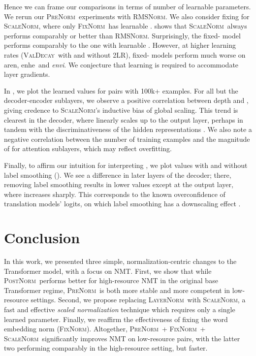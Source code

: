 \documentclass[11pt,a4paper]{article}
\newcommand{\keyword}[1]{\textit{#1}}
\newcommand{\arTOen}{ar\textrightarrow en}
\newcommand{\enTOhe}{en\textrightarrow he}
\newcommand{\enTOvi}{\textit{en\textrightarrow vi}}
\newcommand{\LNorm}{\textsc{LayerNorm}}
\newcommand{\SCNorm}{\textsc{ScaleNorm}}
\newcommand{\RMSNorm}{\textsc{RMSNorm}}
\newcommand{\PreNorm}{\textsc{PreNorm}}
\newcommand{\PostNorm}{\textsc{PostNorm}}
\newcommand{\fixnorm}{\textsc{FixNorm}}
\newcommand{\VALBASED}{\textsc{ValDecay}}
\newcommand{\lrtwo}{\textsc{2LR}}
\begin{document}
Hence we can frame our comparisons in terms of number of learnable parameters. We rerun our \PreNorm\ experiments with \RMSNorm. We also consider fixing  for \SCNorm, where only \fixnorm\ has learnable .  shows that \SCNorm\ always performs comparably or better than \RMSNorm. Surprisingly, the fixed- model performs comparably to the one with learnable . However, at higher learning rates (\VALBASED\ with and without \lrtwo), fixed- models perform much worse on \arTOen, \enTOhe\, and \enTOvi. We conjecture that learning  is required to accommodate layer gradients.

 In , we plot the learned  values for pairs with 100k+ examples. For all but the decoder-encoder sublayers, we observe a positive correlation between depth and , giving credence to \SCNorm's inductive bias of global scaling. This trend is clearest in the decoder, where  linearly scales up to the output layer, perhaps in tandem with the discriminativeness of the hidden representations \cite{LiangHL18}. We also note a negative correlation between the number of training examples and the magnitude of  for attention sublayers, which may reflect overfitting.

Finally, to affirm our intuition for interpreting , we plot  values with and without label smoothing (). We see a difference in later layers of the decoder; there, removing label smoothing results in lower  values except at the output layer, where  increases sharply. This corresponds to the known overconfidence of translation models' logits, on which label smoothing has a downscaling effect \cite{Muller2019}.
 \section{Conclusion}
In this work, we presented three simple, normalization-centric changes to the Transformer model, with a focus on NMT. First, we show that while \PostNorm\ performs better for high-resource NMT in the original base Transformer regime, \PreNorm\ is both more stable and more competent in low-resource settings. Second, we propose replacing \LNorm\ with \SCNorm, a fast and effective \keyword{scaled  normalization} technique which requires only a single learned parameter. Finally, we reaffirm the effectiveness of fixing the word embedding norm (\fixnorm). Altogether, \PreNorm\ + \fixnorm\ + \SCNorm\ significantly improves NMT on low-resource pairs, with the latter two performing comparably in the high-resource setting, but faster.
\end{document}
